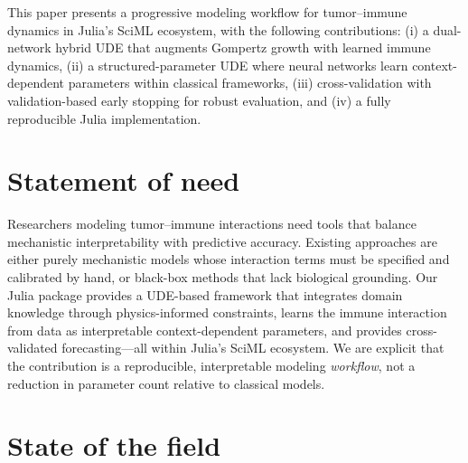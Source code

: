 \documentclass{juliacon}
\begin{document}
This paper presents a progressive modeling workflow for tumor--immune dynamics in Julia's SciML ecosystem, with the following contributions: (i) a dual-network hybrid UDE that augments Gompertz growth with learned immune dynamics, (ii) a structured-parameter UDE where neural networks learn context-dependent parameters within classical frameworks, (iii) cross-validation with validation-based early stopping for robust evaluation, and (iv) a fully reproducible Julia implementation.

\section{Statement of need}
\label{sec:statement-of-need}

Researchers modeling tumor--immune interactions need tools that balance mechanistic interpretability with predictive accuracy. Existing approaches are either purely mechanistic models whose interaction terms must be specified and calibrated by hand, or black-box methods that lack biological grounding. Our Julia package provides a UDE-based framework that integrates domain knowledge through physics-informed constraints, learns the immune interaction from data as interpretable context-dependent parameters, and provides cross-validated forecasting---all within Julia's SciML ecosystem. We are explicit that the contribution is a reproducible, interpretable modeling \emph{workflow}, not a reduction in parameter count relative to classical models.

\section{State of the field}
\label{sec:state-of-the-field}
\end{document}
